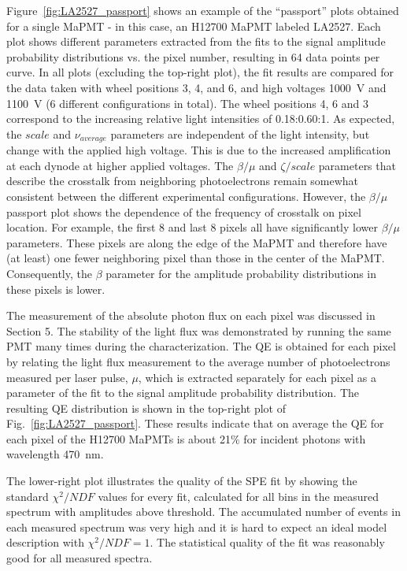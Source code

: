 Figure~\ref{fig:LA2527_passport} shows an example of the ``passport'' plots obtained for a single MaPMT - in this case, an H12700 MaPMT labeled LA2527. 
Each plot shows different parameters extracted from the fits to the signal amplitude probability distributions vs. the pixel number, resulting in 64 data points per curve.
In all plots (excluding the top-right plot), the fit results are compared for the data taken with wheel positions 3, 4, and 6, and high voltages 1000~V and 1100~V (6 different configurations in total).
The wheel positions 4, 6 and 3 correspond to the increasing relative light intensities of 0.18:0.60:1.
As expected, the $scale$ and $\nu_{average}$ parameters are independent of the light intensity, but change with the applied high voltage. 
This is due to the increased amplification at each dynode at higher applied voltages.
The $\beta/\mu$ and $\zeta/scale$ parameters that describe the crosstalk from neighboring photoelectrons remain somewhat consistent between the different experimental configurations. 
However, the $\beta/\mu$ passport plot shows the dependence of the frequency of crosstalk on pixel location. For example, the first 8 and last 8 pixels all have significantly lower $\beta/\mu$ parameters. These pixels are along the edge of the MaPMT and therefore have (at least) one fewer neighboring pixel than those in the center of the MaPMT.
Consequently, the $\beta$ parameter for the amplitude probability distributions in these pixels is lower. 

The measurement of the absolute photon flux on each pixel was discussed in Section 5. 
The stability of the light flux was demonstrated by running the same PMT many times during the characterization.
The QE is obtained for each pixel by relating the light flux measurement to the average number of photoelectrons measured per laser pulse, $\mu$, which is extracted separately for each pixel as a parameter of the fit to the signal amplitude probability distribution. The resulting QE distribution is shown in the top-right plot of Fig.~\ref{fig:LA2527_passport}. These results indicate that on average the QE for each pixel of the H12700 MaPMTs is about 21$\%$ for incident photons with wavelength 470~nm.

The lower-right plot illustrates the quality of the SPE fit by showing the standard $\chi^2/NDF$ values for every fit, calculated for all bins in the measured spectrum with amplitudes above threshold. The accumulated number of events in each measured spectrum was very high and it is hard to expect an ideal model description with $\chi^2/NDF = 1$. The statistical quality of the fit was reasonably good for all measured spectra.

